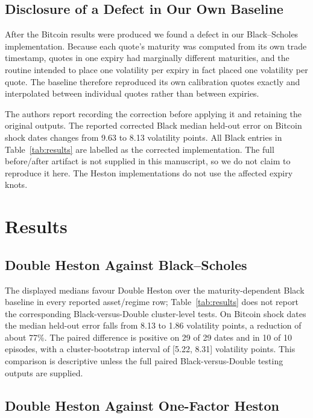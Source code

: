 \documentclass[runningheads]{llncs}
\begin{document}
\subsection{Disclosure of a Defect in Our Own Baseline}
\label{sec:defect}

After the Bitcoin results were produced we found a defect in our
Black--Scholes implementation. Because each quote's maturity was
computed from its own trade timestamp, quotes in one expiry had
marginally different maturities, and the routine intended to place one
volatility per expiry in fact placed one volatility per quote. The
baseline therefore reproduced its own calibration quotes exactly and
interpolated between individual quotes rather than between expiries.

The authors report recording the correction before applying it and
retaining the original outputs. The reported corrected Black median
held-out error on Bitcoin shock dates changes from 9.63 to 8.13
volatility points. All Black entries in Table~\ref{tab:results} are
labelled as the corrected implementation. The full before/after artifact
is not supplied in this manuscript, so we do not claim to reproduce it
here. The Heston implementations do not use the affected expiry knots.

\section{Results}
\label{sec:results}

\subsection{Double Heston Against Black--Scholes}
\label{sec:vsbs}

The displayed medians favour Double Heston over the maturity-dependent
Black baseline in every reported asset/regime row;
Table~\ref{tab:results} does not report the corresponding
Black-versus-Double cluster-level tests. On Bitcoin shock dates the
median held-out error falls from 8.13 to 1.86 volatility points, a
reduction of about 77\%. The paired difference is positive on 29 of 29
dates and in 10 of 10 episodes, with a cluster-bootstrap interval of
[5.22, 8.31] volatility points. This comparison is descriptive unless
the full paired Black-versus-Double testing outputs are supplied.

\subsection{Double Heston Against One-Factor Heston}
\label{sec:vssh}
\end{document}
